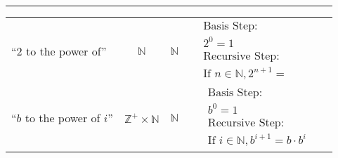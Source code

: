 \begin{center}
\begin{tabular}{p{0.65in}ccp{2.4in}p{2.4in}}
{\begin{align*}
    \end{align*}}\\
\hline
``$2$ to the power of''& $\mathbb{N}$ & $\mathbb{N}$ & 
{\begin{align*}    
&\textrm{Basis Step:} \\
&2^0= 1 \\
&\textrm{Recursive Step:}\\
&\textrm{If } n \in \mathbb{N}, 2^{n+1} = \phantom{2 \cdot 2^n}
\end{align*}}\\
\hline
``$b$ to the power of $i$''& $\mathbb{Z}^+ \times \mathbb{N}$ & $\mathbb{N}$ & 
{\begin{align*}    
&\textrm{Basis Step:} \\
&b^0 = 1 \\
&\textrm{Recursive Step:}\\
&\textrm{If } i \in \mathbb{N}, b^{i+1} = b \cdot b^i
\end{align*}}
\end{tabular}
\end{center}

\newpage